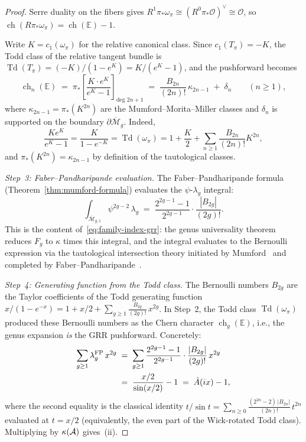\begin{proof}
Serre duality on the fibers gives
$R^1\pi_*\omega_\pi \cong (R^0\pi_*\mathcal{O})^\vee \cong \mathcal{O}$,
so $\operatorname{ch}(R\pi_*\omega_\pi) = \operatorname{ch}(\mathbb{E}) - 1$.

Write $K = c_1(\omega_\pi)$ for the relative canonical class.  Since
$c_1(T_\pi) = -K$, the Todd class of the relative tangent bundle is
$\operatorname{Td}(T_\pi) = (-K)/(1 - e^K) = K/(e^K - 1)$, and the
pushforward becomes
\begin{equation}\label{eq:mumford-chern-character}
\operatorname{ch}_n(\mathbb{E})
\;=\;
\pi_*\!\left[
  \frac{K \cdot e^K}{e^K - 1}
\right]_{\text{deg } 2n+1}
\;=\;
\frac{B_{2n}}{(2n)!}\,\kappa_{2n-1}
\;+\; \delta_n
\qquad (n \geq 1),
\end{equation}
where $\kappa_{2n-1} = \pi_*(K^{2n})$ are the
Mumford--Morita--Miller classes \cite{Mumford83}
and $\delta_n$ is supported on the boundary
$\partial\overline{\mathcal{M}}_g$.
Indeed,
\[
\frac{K e^K}{e^K-1}
= \frac{K}{1 - e^{-K}}
= \operatorname{Td}(\omega_\pi)
= 1 + \frac{K}{2} + \sum_{n \geq 1} \frac{B_{2n}}{(2n)!} K^{2n},
\]
and $\pi_*(K^{2n}) = \kappa_{2n-1}$ by definition of the tautological
classes.

\emph{Step~3: Faber--Pandharipande evaluation.}
The Faber--Pandharipande formula
(Theorem~\ref{thm:mumford-formula}) evaluates the
$\psi$-$\lambda_g$ integral:
\[
\int_{\overline{\mathcal{M}}_{g,1}} \psi^{2g-2}\,\lambda_g
\;=\;
\frac{2^{2g-1}-1}{2^{2g-1}} \cdot
\frac{|B_{2g}|}{(2g)!}.
\]
This is the content of~\eqref{eq:family-index-grr}: the genus
universality theorem reduces $F_g$ to $\kappa$ times this
integral, and the integral evaluates to the Bernoulli expression
via the tautological intersection theory initiated by
Mumford~\cite{Mumford83} and completed by
Faber--Pandharipande~\cite{FP00}.

\emph{Step~4: Generating function from the Todd class.}
The Bernoulli numbers $B_{2g}$ are the Taylor coefficients of
the Todd generating function
$x/(1 - e^{-x}) = 1 + x/2 + \sum_{g \geq 1}
\frac{B_{2g}}{(2g)!}\, x^{2g}$.
In Step~2, the Todd class $\operatorname{Td}(\omega_\pi)$
produced these Bernoulli numbers as the Chern character
$\operatorname{ch}_g(\mathbb{E})$, i.e., the genus expansion
\emph{is} the GRR pushforward.
Concretely:
\begin{align}
\sum_{g \geq 1} \lambda_g^{\mathrm{FP}}\, x^{2g}
&\;=\;
\sum_{g \geq 1}
\frac{2^{2g-1}-1}{2^{2g-1}} \cdot
\frac{|B_{2g}|}{(2g)!}\, x^{2g}
\notag \\
&\;=\;
\frac{x/2}{\sin(x/2)} - 1
\;=\; \hat{A}(ix) - 1,
\label{eq:bernoulli-a-hat}
\end{align}
where the second equality is the classical identity
$t/\sin t = \sum_{n \geq 0}
\frac{(2^{2n}-2)\,|B_{2n}|}{(2n)!}\,t^{2n}$
evaluated at $t = x/2$ (equivalently, the even part of
the Wick-rotated Todd class).
Multiplying by $\kappa(\mathcal{A})$ gives~(ii).


\end{proof}
